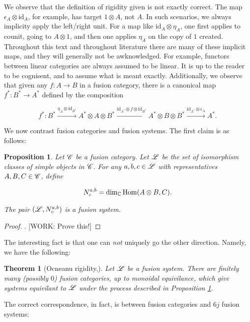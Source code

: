 \documentclass{article}
\newtheorem{theorem}{Theorem}[section]
\newtheorem{proposition}{Proposition}[section]
\theoremstyle{definition}
\numberwithin{figure}{section}
\begin{document}
We observe that the definition of rigidity given is not exactly correct. The map $\epsilon_{A}\otimes \text{id}_A$, for example, has target $1\otimes A$, not $A$. In such scenarios, we always implicity apply the left/right unit. For a map like $\text{id}_A\otimes \eta_A$, one first applies to counit, going to $A\otimes 1$, and then one applies $\eta_A$ on the copy of $1$ created. Throughout this text and throughout literature there are many of these implicit maps, and they will generally not be awknowledged. For example, functors between linear categories are always assumed to be linear. It is up to the reader to be cognisent, and to assume what is meant exactly. Additionally, we observe that given any $f:A\to B$ in a fusion category, there is a canonical map $f^{*}:B^*\to A^*$ defined by the composition

$$f^*:B^*\xrightarrow{\eta_A\otimes \text{id}_{B^*}} A^*\otimes A\otimes B^*\xrightarrow{\text{id}_{A^*}\otimes f\otimes \text{id}_{B^*}} A^*\otimes B\otimes B^* \xrightarrow{\text{id}_{A^*}\otimes \epsilon_A} A^*.$$

We now contrast fusion categories and fusion systems. The first claim is as follows:

\begin{proposition}\label{Make fusion system} Let $\mathscr{C}$ be a fusion category. Let $\mathscr{L}$ be the set of isomorphism classes of simple objects in $\mathscr{C}$. For any $a,b,c\in \mathscr{L}$ with representatives $A,B,C\in\mathscr{C}$, define

$$N^{a,b}_c=\dim_{\mathbb{C}}\mathrm{Hom}(A\otimes B, C).$$

The pair $(\mathscr{L},N^{a,b}_{c})$ is a fusion system.
\end{proposition}
\begin{proof}. [WORK: Prove this!]
\end{proof}

The interesting fact is that one can \textit{not} uniquely go the other direction. Namely, we have the following:

\begin{theorem}[Ocneanu rigidity,\cite{gainutdinov2019davydov}] Let $\mathscr{L}$ be a fusion system. There are finitely many (possibly $0$) fusion categories, up to monoidal equivilance, which give systems equivilant to $\mathscr{L}$ under the process described in Proposition \ref{Make fusion system}.
\end{theorem}

The correct correspondence, in fact, is between fusion categories and $6j$ fusion systems:
\end{document}
